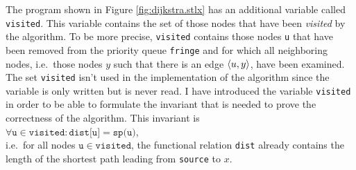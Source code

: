 The program shown in Figure \ref{fig:dijkstra.stlx} has an additional variable called \texttt{visited}.
This variable contains the set of those nodes that have been  \emph{visited} by the algorithm.
To be more precise, \texttt{visited} contains those nodes \texttt{u} that have been removed from the
priority queue \texttt{fringe} and for which all neighboring nodes, i.e.~those nodes $y$ such that
there is an edge $\pair(u,y)$, have been examined.
The set \texttt{visited} isn't used in the implementation of the algorithm since the variable is
only written but is never read.
I have introduced the variable \texttt{visited} in order to be able to formulate the invariant that
is needed to prove the correctness of the algorithm.  This invariant is
\\[0.2cm]
\hspace*{1.3cm}
$\forall \mathtt{u}\in\mathtt{visited}: \texttt{dist[u]} = \texttt{sp(u)}$,
\\[0.2cm]
i.e.~for all nodes $\mathtt{u} \in \texttt{visited}$, the functional relation \texttt{dist}
already contains the length of the shortest path leading from \texttt{source} to $x$.  
\vspace*{0.1cm}

